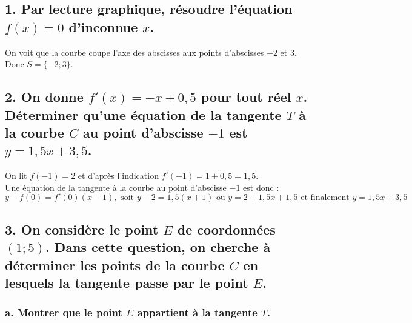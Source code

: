 	
	\subsection*{1. Par lecture graphique, résoudre l'équation $f(x) = 0$ d'inconnue $x$.}
	
On voit que la courbe coupe l'axe des abscisses aux points d'abscisses $-2$ et $3$. \\
	Donc $S = \{-2; 3\}$.
	
	\subsection*{2. On donne $f'(x) = -x + 0,5$ pour tout réel $x$. Déterminer qu'une équation de la tangente $T$ à la courbe $C$ au point d'abscisse $-1$ est $y = 1,5x + 3,5$.}
	
On lit $f(-1) = 2$ et d'après l'indication $f'(-1) = 1 + 0,5 = 1,5$.\\
Une équation de la tangente à la courbe au point d'abscisse $-1$ est donc :
	\[
	y - f(0) = f'(0)(x - 1), \text{ soit } y - 2 = 1,5(x + 1) \text{ ou } y = 2 + 1,5x + 1,5 \text{ et finalement } y = 1,5x + 3,5
	\]
	
	\subsection*{3. On considère le point $E$ de coordonnées $(1; 5)$. Dans cette question, on cherche à déterminer les points de la courbe $C$ en lesquels la tangente passe par le point $E$.}
	
	\subsubsection*{a. Montrer que le point $E$ appartient à la tangente $T$.}
	
